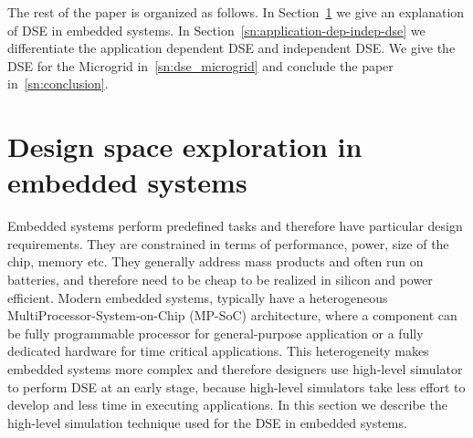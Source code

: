 \documentclass{article}
\begin{document}
The rest of the paper is organized as follows. In
Section~\ref{sn:dse_embedded_systems} we give an explanation of DSE in embedded
systems. In Section~\ref{sn:application-dep-indep-dse} we differentiate the
application dependent DSE and independent DSE. We give the DSE for the
Microgrid in~\ref{sn:dse_microgrid} and conclude the paper
in~\ref{sn:conclusion}.

\section{Design space exploration in embedded systems}
\label{sn:dse_embedded_systems}

Embedded systems perform predefined tasks and therefore have particular design
requirements. They are constrained in terms of performance, power, size of the
chip, memory etc. They generally address mass products and often run on
batteries, and therefore need to be cheap to be realized in silicon and power
efficient. Modern embedded systems, typically have a heterogeneous
MultiProcessor-System-on-Chip (MP-SoC) architecture, where a component can be
fully programmable processor for general-purpose application or a fully
dedicated hardware for time critical applications. This heterogeneity makes
embedded systems more complex and therefore designers use high-level simulator
to perform DSE at an early stage, because high-level simulators take less
effort to develop and less time in executing applications. In this section we
describe the high-level simulation technique used for the DSE in embedded
systems. 
\end{document}
